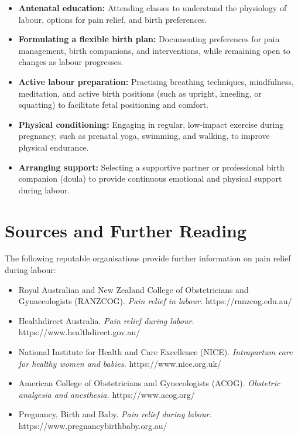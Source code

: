 \begin{itemize}
    \item \textbf{Antenatal education:} Attending classes to understand the physiology of labour, options for pain relief, and birth preferences.
    \item \textbf{Formulating a flexible birth plan:} Documenting preferences for pain management, birth companions, and interventions, while remaining open to changes as labour progresses.
    \item \textbf{Active labour preparation:} Practising breathing techniques, mindfulness, meditation, and active birth positions (such as upright, kneeling, or squatting) to facilitate fetal positioning and comfort.
    \item \textbf{Physical conditioning:} Engaging in regular, low-impact exercise during pregnancy, such as prenatal yoga, swimming, and walking, to improve physical endurance.
    \item \textbf{Arranging support:} Selecting a supportive partner or professional birth companion (doula) to provide continuous emotional and physical support during labour.
\end{itemize}

\section*{Sources and Further Reading}
The following reputable organisations provide further information on pain relief during labour:

\begin{itemize}
    \item Royal Australian and New Zealand College of Obstetricians and Gynaecologists (RANZCOG). \textit{Pain relief in labour.} https://ranzcog.edu.au/
    \item Healthdirect Australia. \textit{Pain relief during labour.} https://www.healthdirect.gov.au/
    \item National Institute for Health and Care Excellence (NICE). \textit{Intrapartum care for healthy women and babies.} https://www.nice.org.uk/
    \item American College of Obstetricians and Gynecologists (ACOG). \textit{Obstetric analgesia and anesthesia.} https://www.acog.org/
    \item Pregnancy, Birth and Baby. \textit{Pain relief during labour.} https://www.pregnancybirthbaby.org.au/
\end{itemize}
